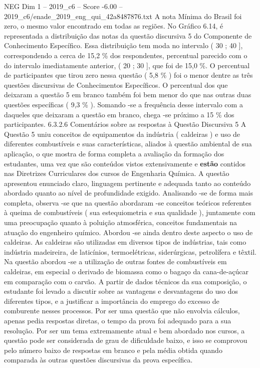 \begin{textsample}{NEG Dim 1 – 2019\_c6 – Score -6.00 – 2019\_c6/enade\_2019\_eng\_qui\_42a8487876.txt}
A nota Mínima do Brasil foi zero, o mesmo valor encontrado em todas as regiões.
No Gráfico 6.14, é representada a distribuição das notas da questão discursiva 5 do Componente de Conhecimento Específico.
Essa distribuição tem moda no intervalo ( 30 ; 40 ], correspondendo a cerca de 15,2 \% dos respondentes, percentual parecido com o do intervalo imediatamente anterior, ( 20 ; 30 ], que foi de 15,0 \%.
O percentual de participantes que tirou zero nessa questão ( 5,8 \% ) foi o menor dentre as três questões discursivas de Conhecimentos Específicos.
O percentual dos que deixaram a questão 5 em branco também foi bem menor do que nas outras duas questões específicas ( 9,3 \% ).
Somando -se a frequência desse intervalo com a daqueles que deixaram a questão em branco, chega -se próximo a 15 \% dos participantes. 6.3.2.6 Comentários sobre as respostas à Questão Discursiva 5 A Questão 5 uniu conceitos de equipamentos da indústria ( caldeiras ) e uso de diferentes combustíveis e suas características, aliados à questão ambiental de sua aplicação, o que mostra de forma completa a avaliação da formação dos estudantes, uma vez que são conteúdos vistos extensivamente e \textbf{estão} contidos nas Diretrizes Curriculares dos cursos de Engenharia Química.
A questão apresentou enunciado claro, linguagem pertinente e adequada tanto ao conteúdo abordado quanto ao nível de profundidade exigido.
Analisando -se de forma mais completa, observa -se que na questão abordaram -se conceitos teóricos referentes à queima de combustíveis ( sua estequiometria e sua qualidade ), juntamente com uma preocupação quanto à poluição atmosférica, conceitos fundamentais na atuação do engenheiro químico.
Abordou -se ainda dentro deste aspecto o uso de caldeiras.
As caldeiras são utilizadas em diversos tipos de indústrias, tais como indústria madeireira, de laticínios, termoelétricas, siderúrgicas, petrolífera e têxtil.
Na questão abordou -se a utilização de outras fontes de combustíveis em caldeiras, em especial o derivado de biomassa como o bagaço da cana-de-açúcar em comparação com o carvão.
A partir de dados técnicos da sua composição, o estudante foi levado a discutir sobre as vantagens e desvantagens do uso dos diferentes tipos, e a justificar a importância do emprego do excesso de comburente nesses processos.
Por ser uma questão que não envolvia cálculos, apenas pedia respostas diretas, o tempo da prova foi adequado para a sua resolução.
Por ser um tema extremamente atual e bem abordado nos cursos, a questão pode ser considerada de grau de dificuldade baixo, e isso se comprovou pelo número baixo de respostas em branco e pela média obtida quando comparada às outras questões discursivas da prova específica.

\end{textsample}
